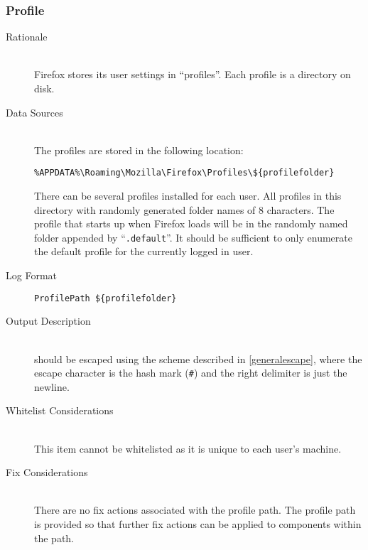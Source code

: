 \subsubsection{Profile}
\begin{description}
\item[Rationale] \hfill \\
Firefox stores its user settings in ``profiles''.  Each profile is a directory
on disk.  
\item[Data Sources] \hfill \\
The profiles are stored in the following location:
\vspace{-\baselineskip}
\begin{verbatim}
%APPDATA%\Roaming\Mozilla\Firefox\Profiles\${profilefolder}
\end{verbatim}
There can be several profiles installed for each user.   All profiles in this
directory with randomly generated folder names of 8 characters.  The profile
that starts up when Firefox loads will be in the randomly named folder appended
by ``\verb|.default|''.  It should be sufficient to only enumerate the default
profile for the currently logged in user.
\item[Log Format] \hfill 
\vspace{-\baselineskip}
\begin{verbatim}
ProfilePath ${profilefolder}
\end{verbatim}
\item[Output Description] \hfill \\
 should be escaped using the scheme described in
\ref{generalescape}, where the escape character is the hash mark (\verb|#|) and
the right delimiter is just the newline.
\item[Whitelist Considerations] \hfill \\
This item cannot be whitelisted as it is unique to each user's machine.
\item[Fix Considerations] \hfill \\
There are no fix actions associated with the profile path.  The profile path is
provided so that further fix actions can be applied to components within the
path.
\end{description}


